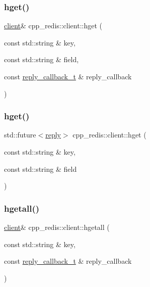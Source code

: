 \subsubsection{\texorpdfstring{hget()}{hget()}\hspace{0.1cm}{\footnotesize\ttfamily [1/2]}}
{\footnotesize\ttfamily \hyperlink{classcpp__redis_1_1client}{client}\& cpp\+\_\+redis\+::client\+::hget (\begin{DoxyParamCaption}\item[{const std\+::string \&}]{key,  }\item[{const std\+::string \&}]{field,  }\item[{const \hyperlink{classcpp__redis_1_1client_a061a1140d36d2eaeda82b09a0bb3f9f2}{reply\+\_\+callback\+\_\+t} \&}]{reply\+\_\+callback }\end{DoxyParamCaption})}

\mbox{\label{classcpp__redis_1_1client_aa84b4c8e9391f5ed37d4c9ef977e2c85}} 
\subsubsection{\texorpdfstring{hget()}{hget()}\hspace{0.1cm}{\footnotesize\ttfamily [2/2]}}
{\footnotesize\ttfamily std\+::future$<$\hyperlink{classcpp__redis_1_1reply}{reply}$>$ cpp\+\_\+redis\+::client\+::hget (\begin{DoxyParamCaption}\item[{const std\+::string \&}]{key,  }\item[{const std\+::string \&}]{field }\end{DoxyParamCaption})}

\mbox{\label{classcpp__redis_1_1client_a8bd82cb86dad87a944c039a57bf67968}} 
\subsubsection{\texorpdfstring{hgetall()}{hgetall()}\hspace{0.1cm}{\footnotesize\ttfamily [1/2]}}
{\footnotesize\ttfamily \hyperlink{classcpp__redis_1_1client}{client}\& cpp\+\_\+redis\+::client\+::hgetall (\begin{DoxyParamCaption}\item[{const std\+::string \&}]{key,  }\item[{const \hyperlink{classcpp__redis_1_1client_a061a1140d36d2eaeda82b09a0bb3f9f2}{reply\+\_\+callback\+\_\+t} \&}]{reply\+\_\+callback }\end{DoxyParamCaption})}

